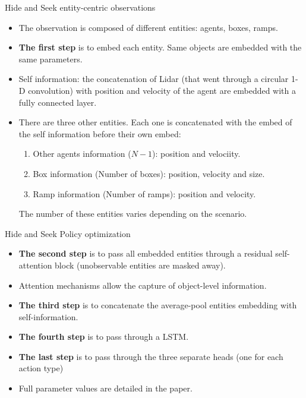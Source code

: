 \documentclass[9pt, hyperref={pdfusetitle,colorlinks=true,allcolors=DarkBlue}]{beamer}
\begin{document}
\begin{frame}{Hide and Seek entity-centric observations}
\begin{itemize}
    \item The observation is composed of different entities: agents, boxes, ramps.
    \item \textbf{The first step} is to embed each entity. Same objects are embedded with the same parameters.
    \item Self information: the concatenation of Lidar (that went through a circular 1-D convolution) with position and velocity of the agent are embedded with a fully connected layer.
    \item There are three other entities. Each one is concatenated with the embed of the self information before their own embed:
    \begin{enumerate}
        \item Other agents information ($N-1$): position and velociity.
        \item Box information (Number of boxes): position, velocity and size.
        \item Ramp information (Number of ramps): position and velocity.
    \end{enumerate}
    The number of these entities varies depending on the scenario.
\end{itemize}{}
\end{frame}{}

\begin{frame}{Hide and Seek Policy optimization}
\begin{itemize}
    \item \textbf{The second step} is to pass all embedded entities through a residual self-attention block (unobservable entities are masked away).
    \item Attention mechanisms allow the capture of object-level information.
    \item \textbf{The third step} is to concatenate the average-pool entities embedding with self-information.
    \item \textbf{The fourth step} is to pass through a LSTM.
    \item \textbf{The last step} is to pass through the three separate heads (one for each action type)
    \item Full parameter values are detailed in the paper.
\end{itemize}{}
\end{frame}{}
\end{document}
